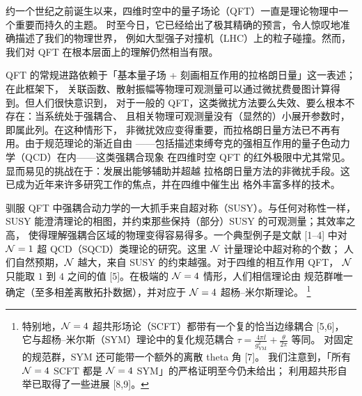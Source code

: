 

约一个世纪之前诞生以来，四维时空中的量子场论（QFT）一直是理论物理中一个重要而持久的主题。
时至今日，它已经给出了极其精确的预言，令人惊叹地准确描述了我们的物理世界，
例如大型强子对撞机（LHC）上的粒子碰撞。然而，我们对 QFT 在根本层面上的理解仍然相当有限。

QFT 的常规进路依赖于「基本量子场 + 刻画相互作用的拉格朗日量」这一表述；在此框架下，
关联函数、散射振幅等物理可观测量可以通过微扰费曼图计算得到。但人们很快意识到，
对于一般的 QFT，这类微扰方法要么失效、要么根本不存在：当系统处于强耦合、
且相关物理可观测量没有（显然的）小展开参数时，即属此列。在这种情形下，
非微扰效应变得重要，而拉格朗日量方法已不再有用。由于规范理论的渐近自由
——包括描述束缚夸克的强相互作用的量子色动力学（QCD）在内——这类强耦合现象
在四维时空 QFT 的红外极限中尤其常见。显而易见的挑战在于：发展出能够辅助并超越
拉格朗日量方法的非微扰手段。这已成为近年来许多研究工作的焦点，并在四维中催生出
格外丰富多样的技术。

驯服 QFT 中强耦合动力学的一大抓手来自超对称（SUSY）。与任何对称性一样，
SUSY 能澄清理论的相图，并约束那些保持（部分）SUSY 的可观测量；其效率之高，
使得理解强耦合区域的物理变得容易得多。一个典型例子是文献 [1--4] 中对
$\mathcal{N}=1$ 超 QCD（SQCD）类理论的研究。这里 $\mathcal{N}$ 计量理论中超对称的个数；
人们自然预期，$\mathcal{N}$ 越大，来自 SUSY 的约束越强。对于四维的相互作用 QFT，
$\mathcal{N}$ 只能取 $1$ 到 $4$ 之间的值 [5]。在极端的 $\mathcal{N}=4$ 情形，人们相信理论由
规范群唯一确定（至多相差离散拓扑数据），并对应于 $\mathcal{N}=4$ 超杨--米尔斯理论。%
\footnote{特别地，$\mathcal{N}=4$ 超共形场论（SCFT）都带有一个复的恰当边缘耦合 [5,6]，
它与超杨--米尔斯（SYM）理论中的复化规范耦合
$\tau=\frac{4\pi\ii}{g_{\mathrm{YM}}^2}+\frac{\theta}{2\pi}$ 等同。
对固定的规范群，SYM 还可能带一个额外的离散 theta 角 [7]。
我们注意到，「所有 $\mathcal{N}=4$ SCFT 都是 $\mathcal{N}=4$ SYM」的严格证明至今仍未给出；
利用超共形自举已取得了一些进展 [8,9]。}

